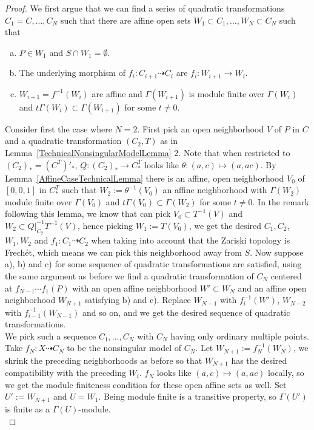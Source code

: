    \begin{proof}
        We first argue that we can find a series of quadratic transformations\\ $C_1=C,\dots,C_N$ such that there are affine open sets $W_1\subset C_1,\dots, W_N\subset C_N$ such that
        \begin{enumerate}[a)]
            \item $P\in W_1$ and $S\cap W_1 = \emptyset$.
            \item  The underlying morphism of $f_i:C_{i+1}\dashrightarrow C_i$ are $f_i:W_{i+1}\rightarrow W_i$.
            \item $W_{i+1} = f^{-1}(W_i)$ are affine and $\Gamma(W_{i+1})$ is module finite over $\Gamma(W_i)$ and $t\Gamma(W_i)\subset \Gamma(W_{i+1})$ for some $t\neq 0$. 
        \end{enumerate}
        Consider first the case where $N=2$. First pick an open neighborhood $V$ of $P$ in $C$ and a quadratic transformation $(C_2,T)$ as in Lemma~\ref{TechnicalNonsingularModelLemma} 2. Note that when restricted to $(C_2)_\ast=(C^T)'_\ast$, $Q: (C_2)_\ast\rightarrow C^T_\ast$ looks like $\theta : (a,c)\mapsto (a,ac)$. By Lemma~\ref{AffineCaseTechnicalLemma} there is an affine, open neighborhood $V_0$ of $[0,0,1]$ in $C^T_\ast$ such that $W_2 := \theta^{-1}(V_0)$ an affine neighborhood with $\Gamma(W_{2})$ module finite over $\Gamma(V_0)$ and $t\Gamma(V_0)\subset \Gamma(W_{2})$ for some $t\neq 0$. In the remark following this lemma, we know that can pick $V_0\subset T^{-1}(V)$ and $W_2\subset \left.Q\right|_{C_2}^{-1}T^{-1}(V)$, hence picking $W_1:= T(V_0)$, we get the desired $C_1,C_2$, $W_1,W_2$ and $f_1: C_1\dashrightarrow C_2$ when taking into account that the Zariski topology is Frechét, which means we can pick this neighborhood away from $S$. Now suppose a), b) and c) for some sequence of quadratic transformations are satisfied, using the same argument as before we find a quadratic transformation of $C_N$ centered at $f_{N-1}\cdots f_{1}(P)$ with an open affine neighborhood $W'\subset W_{N}$ and an affine open neighborhood $W_{N+1}$ satisfying b) and c). Replace $W_{N-1}$ with $f_i^{-1}(W')$, $W_{N-2}$ with $f_{i-1}^{-1}(W_{N-1})$ and so on, and we get the desired sequence of quadratic transformations.\\ 
        We pick such a sequence $C_1,\dots, C_N$ with $C_N$ having only ordinary multiple points. Take $f_N : X\dashrightarrow C_N$ to be the nonsingular model of $C_N$. Let $W_{N+1} := f_N^{-1}(W_N)$, we shrink the preceding neighborhoods as before so that $W_{N+1}$ has the desired compatibility with the preceding $W_i$. $f_N$ looks like $(a,c)\mapsto (a,ac)$ locally, so we get the module finiteness condition for these open affine sets as well. Set $U':= W_{N+1}$ and $U = W_1$. Being module finite is a transitive property, so $\Gamma(U')$ is finite as a $\Gamma(U)$-module.\\

\end{proof}
